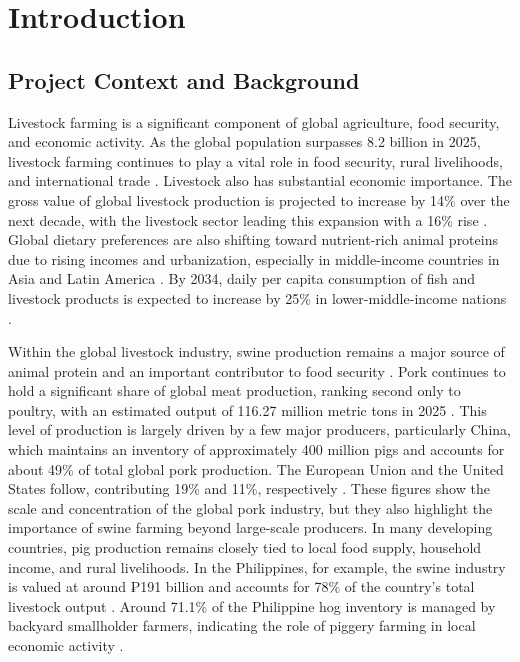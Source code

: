 
\chapter{Introduction}

\section{Project Context and Background}

Livestock farming is a significant component of global agriculture, food security, and economic activity. As the global population surpasses 8.2 billion in 2025, livestock farming continues to play a vital role in food security, rural livelihoods, and international trade \cite{piyush2025animal}\cite{livestockproduction2026}. Livestock also has substantial economic importance. The gross value of global livestock production is projected to increase by 14\% over the next decade, with the livestock sector leading this expansion with a 16\% rise \cite{oecdfao2025outlook}. Global dietary preferences are also shifting toward nutrient-rich animal proteins due to rising incomes and urbanization, especially in middle-income countries in Asia and Latin America \cite{livestockproduction2026}\cite{oecdfao2025outlook}. By 2034, daily per capita consumption of fish and livestock products is expected to increase by 25\% in lower-middle-income nations \cite{oecdfao2025outlook}\cite{livestockproduction2026}.

Within the global livestock industry, swine production remains a major source of animal protein and an important contributor to food security \cite{livestockproduction2026}. Pork continues to hold a significant share of global meat production, ranking second only to poultry, with an estimated output of 116.27 million metric tons in 2025 \cite{usda2026pork}. This level of production is largely driven by a few major producers, particularly China, which maintains an inventory of approximately 400 million pigs and accounts for about 49\% of total global pork production. The European Union and the United States follow, contributing 19\% and 11\%, respectively \cite{usda2026pork}. These figures show the scale and concentration of the global pork industry, but they also highlight the importance of swine farming beyond large-scale producers. In many developing countries, pig production remains closely tied to local food supply, household income, and rural livelihoods. In the Philippines, for example, the swine industry is valued at around ₱191 billion and accounts for 78\% of the country's total livestock output \cite{livestockproduction2026}\cite{porcinews2026philippine}\cite{lo2025rebooting}\cite{villanueva2025philippine}. Around 71.1\% of the Philippine hog inventory is managed by backyard smallholder farmers, indicating the role of piggery farming in local economic activity \cite{lo2025rebooting}.


